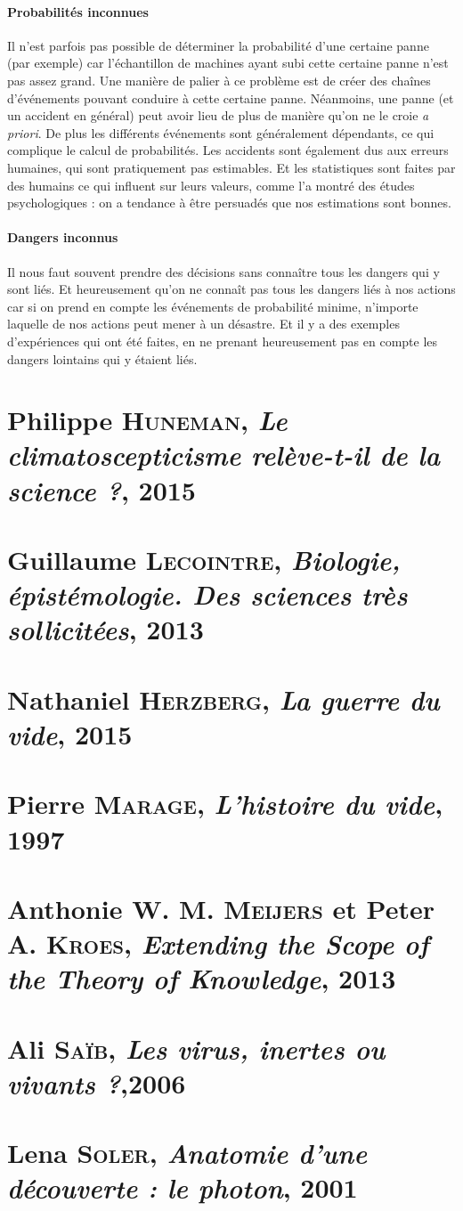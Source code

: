\documentclass{report}
\begin{document}
	\paragraph*{Probabilités inconnues}
	Il n'est parfois pas possible de déterminer la probabilité d'une certaine panne (par exemple) car l'échantillon de machines ayant subi cette certaine panne n'est pas assez grand. Une manière de palier à ce problème est de créer des chaînes d'événements pouvant conduire à cette certaine panne. Néanmoins, une panne (et un accident en général) peut avoir lieu de plus de manière qu'on ne le croie \emph{a priori}. De plus les différents événements sont généralement dépendants, ce qui complique le calcul de probabilités. Les accidents sont également dus aux erreurs humaines, qui sont pratiquement pas estimables. Et les statistiques sont faites par des humains ce qui influent sur leurs valeurs, comme l'a montré des études psychologiques : on a tendance à être persuadés que nos estimations sont bonnes.
	\paragraph*{Dangers inconnus}
	Il nous faut souvent prendre des décisions sans connaître tous les dangers qui y sont liés. Et heureusement qu'on ne connaît pas tous les dangers liés à nos actions car si on prend en compte les événements de probabilité minime, n'importe laquelle de nos actions peut mener à un désastre. Et il y a des exemples d'expériences qui ont été faites, en ne prenant heureusement pas en compte les dangers lointains qui y étaient liés.
	
	\section{Philippe \textsc{Huneman}, \textit{Le climatoscepticisme relève-t-il de la science ?}, 2015}
	
	\section{Guillaume \textsc{Lecointre}, \textit{Biologie, épistémologie. Des sciences très sollicitées}, 2013}
	
	\section{Nathaniel \textsc{Herzberg}, \textit{La guerre du vide}, 2015}
	
	\section{Pierre \textsc{Marage}, \textit{L'histoire du vide}, 1997}
	
	\section{Anthonie W. M. \textsc{Meijers} et Peter A. \textsc{Kroes}, \textit{Extending the Scope of the Theory of Knowledge}, 2013}
	
	\section{Ali \textsc{Saïb}, \textit{Les virus, inertes ou vivants ?},2006}
	
	\section{Lena \textsc{Soler}, \textit{Anatomie d'une découverte : le photon}, 2001}
	
\end{document}
